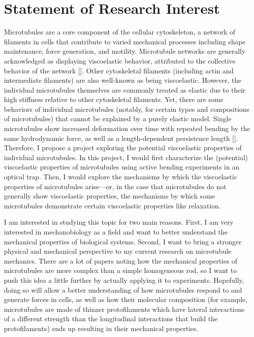 % 
% 
% 

% 
\section{Statement of Research Interest}
Microtubules are a core component of the cellular cytoskeleton, a network of filaments in cells that contribute to varied mechanical processes including shape maintenance, force generation, and motility. Microtubule networks are generally acknowledged as displaying viscoelastic behavior, attributed to the collective behavior of the network [\cite{visco_review, visco_MTs}]. Other cytoskeletal filaments (including actin and intermediate filaments) are also well-known as being viscoelastic. However, the individual microtubules themselves are commonly treated as elastic due to their high stiffness relative to other cytoskeletal filaments. Yet, there are some behaviors of individual microtubules (notably, for certain types and compositions of microtubules) that cannot be explained by a purely elastic model. Single microtubules show increased deformation over time with repeated bending by the same hydrodynamic force, as well as a length-dependent persistence length [\cite{acetyl_aging, Celeg_lumen}]. Therefore, I propose a project exploring the potential viscoelastic properties of individual microtubules. In this project, I would first characterize the (potential) viscoelastic properties of microtubules using active bending experiments in an optical trap. Then, I would explore the mechanisms by which the viscoelastic properties of microtubules arise---or, in the case that microtubules do not generally show viscoelastic properties, the mechanisms by which some microtubules demonstrate certain viscoelastic properties like relaxation.

I am interested in studying this topic for two main reasons. First, I am very interested in mechanobiology as a field and want to better understand the mechanical properties of biological systems. Second, I want to bring a stronger physical and mechanical perspective to my current research on microtubule mechanics. There are a lot of papers noting how the mechanical properties of microtubules are more complex than a simple homogeneous rod, so I want to push this idea a little further by actually applying it to experiments. Hopefully, doing so will allow a better understanding of how microtubules respond to and generate forces in cells, as well as how their molecular composition (for example, microtubules are made of thinner protofilaments which have lateral interactions of a different strength than the longitudinal interactions that build the protofilaments) ends up resulting in their mechanical properties.


